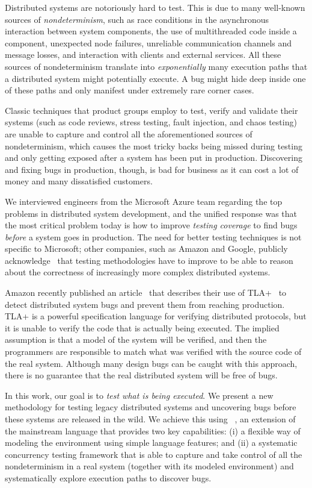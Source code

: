 Distributed systems are notoriously hard to test. This is due to many well-known sources of \emph{nondeterminism}, such as race conditions in the asynchronous interaction between system components, the use of multithreaded code inside a component, unexpected node failures, unreliable communication channels and message losses, and interaction with clients and external services.
%
All these sources of nondeterminism translate into \emph{exponentially} many execution paths that a distributed system might potentially execute. A bug might hide deep inside one of these paths and only manifest under extremely rare corner cases.

Classic techniques that product groups employ to test, verify and validate their systems (such as code reviews, stress testing, fault injection, and chaos testing) are unable to capture and control all the aforementioned sources of nondeterminism, which causes the most tricky backs being missed during testing and only getting exposed after a system has been put in production. Discovering and fixing bugs in production, though, is bad for business as it can cost a lot of money and many dissatisfied customers.

We interviewed engineers from the Microsoft Azure team regarding the top problems in distributed system development, and the unified response was that the most critical problem today is how to improve \emph{testing coverage} to find bugs \emph{before} a system goes in production. The need for better testing techniques is not specific to Microsoft; other companies, such as Amazon and Google, publicly acknowledge~\cite{newcombe2015aws} that testing methodologies have to improve to be able to reason about the correctness of increasingly more complex distributed systems.

Amazon recently published an article~\cite{newcombe2015aws} that describes their use of TLA+~\cite{lamport1994temporal} to detect distributed system bugs and prevent them from reaching production. TLA+ is a powerful specification language for verifying distributed protocols, but it is unable to verify the code that is actually being executed. The implied assumption is that a model of the system will be verified, and then the programmers are responsible to match what was verified with the source code of the real system. Although many design bugs can be caught with this approach, there is no guarantee that the real distributed system will be free of bugs.

In this work, our goal is to \emph{test what is being executed}. We present a new methodology for testing legacy distributed systems and uncovering bugs before these systems are released in the wild. We achieve this using \psharp~\cite{deligiannis2015psharp}, an extension of the mainstream language \csharp that provides two key capabilities: (i) a flexible way of modeling the environment using simple language features; and (ii) a systematic concurrency testing framework that is able to capture and take control of all the nondeterminism in a real system (together with its modeled environment) and systematically explore execution paths to discover bugs.

